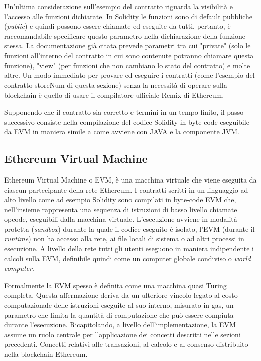 Un’ultima considerazione sull’esempio del contratto riguarda la visibilità e l’accesso alle funzioni dichiarate. In Solidity le funzioni sono di default pubbliche (\emph{public}) e quindi possono essere chiamate ed eseguite da tutti, pertanto, è raccomandabile specificare questo parametro nella dichiarazione della funzione stessa. La documentazione già citata prevede parametri tra cui "private" (solo le funzioni all’interno del contratto in cui sono contenute potranno chiamare questa funzione), "view" (per funzioni che non cambiano lo stato del contratto) e molte altre. Un modo immediato per provare ed eseguire i contratti (come l'esempio del contratto storeNum di questa sezione) senza la necessità di operare sulla blockchain è quello di usare il compilatore ufficiale Remix di Ethereum.

Supponendo che il contratto sia corretto e termini in un tempo finito, il passo successivo consiste nella compilazione del codice Solidity in byte-code eseguibile da EVM in maniera simile a come avviene con JAVA e la componente JVM.

\subsection{Ethereum Virtual Machine}

Ethereum Virtual Machine o EVM, è una macchina virtuale che viene eseguita da ciascun partecipante della rete Ethereum. I contratti scritti in un linguaggio ad alto livello come ad esempio Solidity sono compilati in byte-code EVM che, nell'insieme rappresenta una sequenza di istruzioni di basso livello chiamate opcode, eseguibili dalla macchina virtuale. L’esecuzione avviene in modalità protetta (\emph{sandbox}) durante la quale il codice eseguito è isolato, l’EVM (durante il \emph{runtime}) non ha accesso alla rete, ai file locali di sistema o ad altri processi in esecuzione. A livello della rete tutti gli utenti eseguono in maniera indipendente i calcoli sulla EVM, definibile quindi come un computer globale condiviso o \emph{world computer}.

Formalmente la EVM spesso è definita come una macchina quasi Turing completa. Questa affermazione deriva da un ulteriore vincolo legato al costo computazionale delle istruzioni eseguite al suo interno, misurato in gas, un parametro che limita la quantità di computazione che può essere compiuta durante l’esecuzione. Ricapitolando, a livello dell'implementazione, la EVM assume un ruolo centrale per l'applicazione dei concetti descritti nelle sezioni precedenti. Concetti relativi alle transazioni, al calcolo e al consenso distribuito nella blockchain Ethereum.

